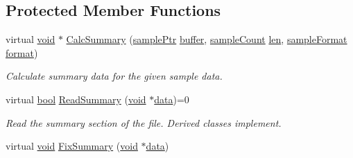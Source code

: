 \subsection*{Protected Member Functions}
\begin{DoxyCompactItemize}
\item 
virtual \hyperlink{sound_8c_ae35f5844602719cf66324f4de2a658b3}{void} $\ast$ \hyperlink{class_block_file_a87b1269de50226600c5f52729117be30}{Calc\+Summary} (\hyperlink{include_2audacity_2_types_8h_aaafb46d1caf7c79262fec96b577215fe}{sample\+Ptr} \hyperlink{structbuffer}{buffer}, \hyperlink{include_2audacity_2_types_8h_afa427e1f521ea5ec12d054e8bd4d0f71}{sample\+Count} \hyperlink{lib_2expat_8h_af86d325fecfc8f47b61fbf5a5146f582}{len}, \hyperlink{include_2audacity_2_types_8h_a9938d2e2f6adef23e745cd80ef379792}{sample\+Format} \hyperlink{_export_p_c_m_8cpp_a317afff57d87a89158c2b038d37b2b08}{format})
\begin{DoxyCompactList}\small\item\em Calculate summary data for the given sample data. \end{DoxyCompactList}\item 
virtual \hyperlink{mac_2config_2i386_2lib-src_2libsoxr_2soxr-config_8h_abb452686968e48b67397da5f97445f5b}{bool} \hyperlink{class_block_file_ab9edd6f8cd08f7075b5c878c9a4ea121}{Read\+Summary} (\hyperlink{sound_8c_ae35f5844602719cf66324f4de2a658b3}{void} $\ast$\hyperlink{lib_2expat_8h_ac39e72a1de1cb50dbdc54b08d0432a24}{data})=0
\begin{DoxyCompactList}\small\item\em Read the summary section of the file. Derived classes implement. \end{DoxyCompactList}\item 
virtual \hyperlink{sound_8c_ae35f5844602719cf66324f4de2a658b3}{void} \hyperlink{class_block_file_abb3580667f6451b2ab0d4cc1a45f7a7a}{Fix\+Summary} (\hyperlink{sound_8c_ae35f5844602719cf66324f4de2a658b3}{void} $\ast$\hyperlink{lib_2expat_8h_ac39e72a1de1cb50dbdc54b08d0432a24}{data})
\end{DoxyCompactItemize}
